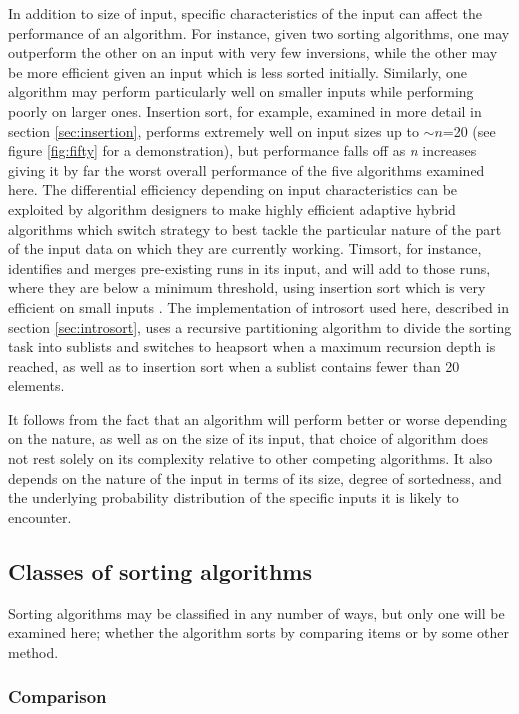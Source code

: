 \documentclass[12pt, a4paper]{article}
\begin{document}
In addition to size of input, specific characteristics of the input can affect the performance of an algorithm. For instance, given two sorting algorithms, one may outperform the other on an input with very few inversions, while the other may be more efficient given an input which is less sorted initially. Similarly, one algorithm may perform particularly well on smaller inputs while performing poorly on larger ones. Insertion sort, for example, examined in more detail in section \ref{sec:insertion}, performs extremely well on input sizes up to $\sim n$=20 (see figure \ref{fig:fifty} for a demonstration), but performance falls off as \emph{n} increases giving it by far the worst overall performance of the five algorithms examined here. The differential efficiency depending on input characteristics can be exploited by algorithm designers to make highly efficient adaptive hybrid algorithms which switch strategy to best tackle the particular nature of the part of the input data on which they are currently working. Timsort, for instance, identifies and merges pre-existing runs in its input, and will add to those runs, where they are below a minimum threshold, using insertion sort which is very efficient on small inputs \autocite{peters:timsort}. The implementation of introsort used here, described in section \ref{sec:introsort}, uses a recursive partitioning algorithm to divide the sorting task into sublists and switches to heapsort when a maximum recursion depth is reached, as well as to insertion sort when a sublist contains fewer than 20 elements.

It follows from the fact that an algorithm will perform better or worse depending on the nature, as well as on the size of its input, that choice of algorithm does not rest solely on its complexity relative to other competing algorithms. It also depends on the nature of the input in terms of its size, degree of sortedness, and the underlying probability distribution of the specific inputs it is likely to encounter.

\subsection{Classes of sorting algorithms}

Sorting algorithms may be classified in any number of ways, but only one will be examined here; whether the algorithm sorts by comparing items or by some other method.

\subsubsection{Comparison}
\end{document}
